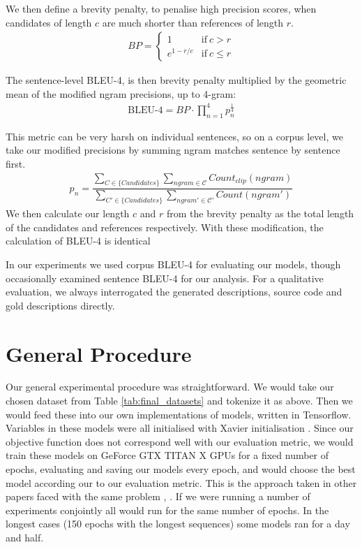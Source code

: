 We then define a brevity penalty, to penalise high precision scores, when candidates of length $c$ are much shorter than references of length $r$.
\begin{align}
BP = \begin{cases}
      1 & \text{if}\ c > r \\
      e^{1-r/c} & \text{if}\ c \leq r
    \end{cases}\nonumber
\end{align}

The sentence-level BLEU-4, is then brevity penalty multiplied by the geometric mean of the modified ngram precisions, up to 4-gram:
\begin{align}
\text{BLEU-4} = BP\cdotp\prod_{n=1}^4 p_n^{\frac{1}{4}}
\end{align}

This metric can be very harsh on individual sentences, so on a corpus level, we take our modified precisions by summing ngram matches sentence by sentence first.
\begin{align}
    p_n = \dfrac{
    \sum_{C \in \{Candidates\}}\sum_{ngram \in \mathcal{C}} Count_{clip}(ngram)}{
    \sum_{C' \in \{Candidates\}}\sum_{ngram' \in \mathcal{C'}} Count(ngram')} \nonumber 
\end{align}
We then calculate our length $c$ and $r$ from the brevity penalty as the total length of the candidates and references respectively.
With these modification, the calculation of BLEU-4 is identical

In our experiments we used corpus BLEU-4 for evaluating our models, though occasionally examined sentence BLEU-4 for our analysis. 
For a qualitative evaluation, we always interrogated the generated descriptions, source code and gold descriptions directly.


\section{General Procedure}

Our general experimental procedure was straightforward. We would take our chosen dataset from Table \ref{tab:final_datasets} and  tokenize it as above. Then we would feed these into our own implementations of models, written in Tensorflow\cite{tensorflow2015-whitepaper}. Variables in these models were all initialised with Xavier initialisation \cite{glorot_understanding_nodate}. Since our objective function does not correspond well with our evaluation metric, we would train these models on GeForce GTX TITAN X GPUs for a fixed number of epochs, evaluating and saving our models every epoch, and would choose the best model according our to our evaluation metric. This is the approach taken in other papers faced with the same problem \cite{bahdanau_neural_2014}, \cite{barone_parallel_2017}.  If we were running a number of experiments conjointly all would run for the same number of epochs. In the longest cases (150 epochs with the longest sequences) some models ran for a day and half.

